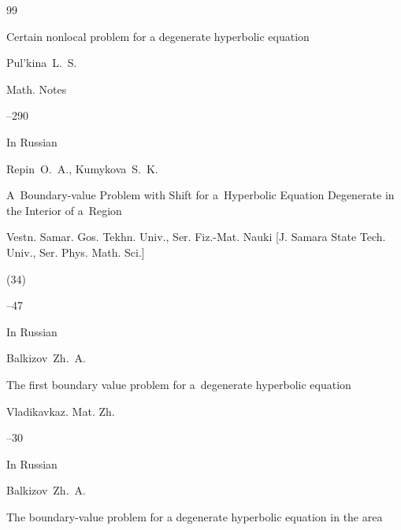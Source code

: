 \begin{thebibliography}{99}

\paper Certain nonlocal problem for a degenerate hyperbolic equation

\by  Pul'kina~L.~S.

\jour Math. Notes




--290







\lang In Russian

\by Repin~O.~A., Kumykova~S.~K.

\paper A~Boundary-value Problem with Shift for a~Hyperbolic Equation Degenerate in the Interior of a~Region

\jour Vestn. Samar. Gos. Tekhn. Univ., Ser. Fiz.-Mat. Nauki \rm [J. Samara State Tech. Univ., Ser. Phys. Math. Sci.]


(34)

--47







\lang In Russian

\by Balkizov~Zh.~A.

\paper The first boundary value problem for a~degenerate hyperbolic equation

\jour Vladikavkaz. Mat. Zh.




--30





\lang In Russian

\by Balkizov~Zh.~A.

\paper The boundary-value problem for a degenerate hyperbolic equation in the area


\end{thebibliography}
